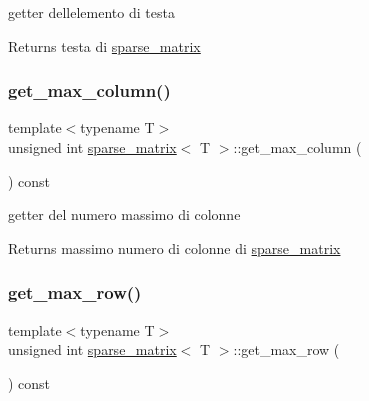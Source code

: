 getter dell\textquotesingle{}elemento di testa 

\begin{DoxyReturn}{Returns}
testa di \hyperlink{classsparse__matrix}{sparse\+\_\+matrix} 
\end{DoxyReturn}
\mbox{\label{classsparse__matrix_a73047cce3fef6fcab0cd3121c99d60cb}} 
\subsubsection{\texorpdfstring{get\+\_\+max\+\_\+column()}{get\_max\_column()}}
{\footnotesize\ttfamily template$<$typename T$>$ \\
unsigned int \hyperlink{classsparse__matrix}{sparse\+\_\+matrix}$<$ T $>$\+::get\+\_\+max\+\_\+column (\begin{DoxyParamCaption}{ }\end{DoxyParamCaption}) const\hspace{0.3cm}{\ttfamily [inline]}}



getter del numero massimo di colonne 

\begin{DoxyReturn}{Returns}
massimo numero di colonne di \hyperlink{classsparse__matrix}{sparse\+\_\+matrix} 
\end{DoxyReturn}
\mbox{\label{classsparse__matrix_aa2b5034b4293e98dbe9c93c85150f65c}} 
\subsubsection{\texorpdfstring{get\+\_\+max\+\_\+row()}{get\_max\_row()}}
{\footnotesize\ttfamily template$<$typename T$>$ \\
unsigned int \hyperlink{classsparse__matrix}{sparse\+\_\+matrix}$<$ T $>$\+::get\+\_\+max\+\_\+row (\begin{DoxyParamCaption}{ }\end{DoxyParamCaption}) const\hspace{0.3cm}{\ttfamily [inline]}}



